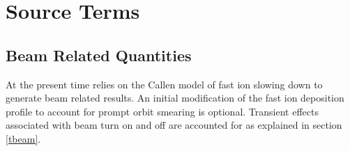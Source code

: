 \section{Source Terms }\label{source}

\subsection{Beam Related Quantities}

At the present time \ot relies on the Callen \cite{Callen74:1} model of fast ion
slowing down to generate beam related results. An initial modification of the
fast ion deposition profile to account for prompt orbit smearing  is optional.
Transient effects associated with beam turn on and off are accounted for as
explained in section \ref{tbeam}. 

